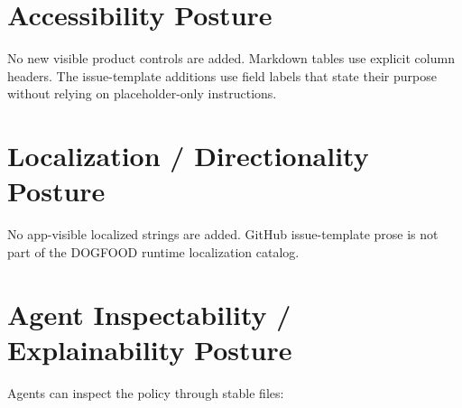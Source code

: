 \section{Accessibility Posture}\label{record-212-accessibility-posture}

No new visible product controls are added. Markdown tables use explicit column headers. The issue-template additions use field labels that state their purpose without relying on placeholder-only instructions.

\section{Localization / Directionality Posture}\label{record-212-localization-directionality-posture}

No app-visible localized strings are added. GitHub issue-template prose is not part of the DOGFOOD runtime localization catalog.

\section{Agent Inspectability / Explainability Posture}\label{record-212-agent-inspectability-explainability-posture}

Agents can inspect the policy through stable files:

